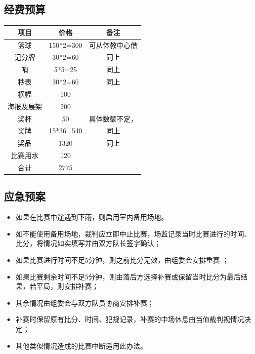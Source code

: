 \documentclass{article}
\begin{document}
\begin{CJK}{UTF8}{gbsn}
		\subsection{经费预算}
		\begin{table}[htbp]
			\centering
			\begin{tabular}{|c|c|c|}
				\hline
				项目 & 价格 & 备注 \\\hline
				篮球　& 150*2=300 & 可从体教中心借\\\hline
				记分牌	&30*2=60&	同上\\\hline
				哨&	5*5=25	&同上\\\hline
				秒表&	30*2=60&	同上\\\hline
				横幅&	100	&\\\hline
				海报及展架&	200&	\\\hline
				奖杯&	50&	具体数额不定， \\\hline
				奖牌	&15*36=540&	同上\\\hline
				奖品&	1320&	同上\\\hline
				比赛用水&	120	&\\\hline
				合计&	2775&	\\\hline
			\end{tabular}
		\end{table}
		\subsection{应急预案}
		\begin{itemize}
			\item 			如果在比赛中途遇到下雨，则启用室内备用场地。
			
			\item 如不能使用备用场地，裁判应立即中止比赛，场监记录当时比赛进行的时间、比分，将情况如实填写并由双方队长签字确认；
			
		\item 	如果比赛进行时间不足5分钟，则之前比分无效，由组委会安排重赛
			；
		\item 	如果比赛剩余时间不足5分钟，则由落后方选择补赛或保留当时比分为最后结果，若平局，则安排补赛；
			
		\item 	其余情况由组委会与双方队员协商安排补赛；
			
		\item 	补赛时保留原有比分、时间、犯规记录，补赛的中场休息由当值裁判视情况决定；
			
		\item 	其他类似情况造成的比赛中断适用此办法。
		\end{itemize}
		

\end{CJK}
\end{document}
